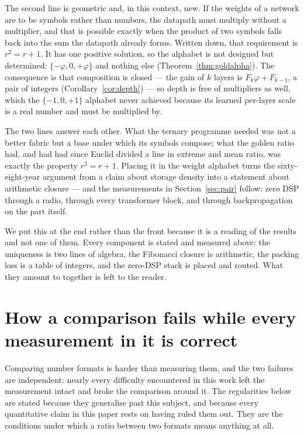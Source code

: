 \documentclass[11pt]{article}
\theoremstyle{definition}
\begin{document}
The second line is geometric and, in this context, new. If the weights of a
network are to be symbols rather than numbers, the datapath must multiply without
a multiplier, and that is possible exactly when the product of two symbols falls
back into the sum the datapath already forms. Written down, that requirement is
$r^2 = r + 1$. It has one positive solution, so the alphabet is not designed but
determined: $\{-\varphi, 0, +\varphi\}$ and nothing else
(Theorem~\ref{thm:goldalpha}). The consequence is that composition is closed ---
the gain of $k$ layers is $F_k\varphi + F_{k-1}$, a pair of integers
(Corollary~\ref{cor:depth}) --- so depth is free of multipliers as well, which the
$\{-1,0,+1\}$ alphabet never achieved because its learned per-layer scale is a
real number and must be multiplied by.

The two lines answer each other. What the ternary programme needed was not a
better fabric but a base under which its symbols compose; what the golden ratio
had, and had had since Euclid divided a line in extreme and mean ratio, was
exactly the property $r^2 = r + 1$. Placing it in the weight alphabet turns the
sixty-eight-year argument from a claim about storage density into a statement
about arithmetic closure --- and the measurements in Section~\ref{sec:pair}
follow: zero DSP through a radio, through every transformer block, and through
backpropagation on the part itself.

We put this at the end rather than the front because it is a reading of the
results and not one of them. Every component is stated and measured above:
the uniqueness is two lines of algebra, the Fibonacci closure is arithmetic, the
packing loss is a table of integers, and the zero-DSP stack is placed and routed.
What they amount to together is left to the reader.



\section{How a comparison fails while every measurement in it is correct}
\label{sec:selfcheck}

Comparing number formats is harder than measuring them, and the two failures
are independent: nearly every difficulty encountered in this work left the
measurement intact and broke the comparison around it. The regularities below are
stated because they generalise past this subject, and because every quantitative
claim in this paper rests on having ruled them out. They are the conditions under
which a ratio between two formats means anything at all.
\end{document}

